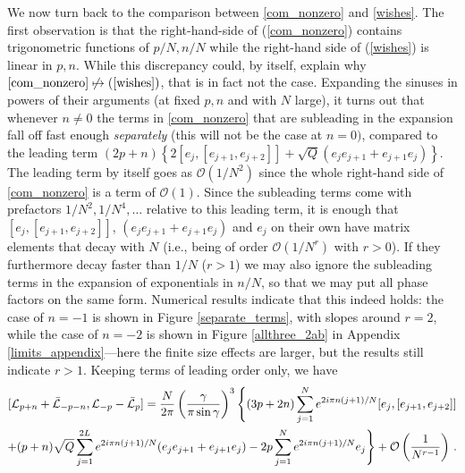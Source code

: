 \documentclass[a4paper,10pt]{article}
\newcommand{\linnea}[1]{$\framebox{\tiny L}$\ \textbf{\texttt{{\color{red}\footnotesize#1}}}}
\newcommand{\KSgen}{\mathcal{L}}
\begin{document}
We now turn back to the comparison between \eqref{com_nonzero} and \eqref{wishes}. The first observation is that the right-hand-side of (\ref{com_nonzero}) contains trigonometric functions of $p/N,n/N$ while the right-hand side of (\ref{wishes}) is linear in $p,n$. While this discrepancy could, by itself, explain why $\eqref{com_nonzero}\not\mapsto (\ref{wishes})$, that is in fact not the case. 
%
%
Expanding the sinuses in powers of their arguments (at fixed $p,n$ and with $N$ large),
it turns out that whenever $n\neq 0$ the terms in \eqref{com_nonzero} that are subleading in the expansion fall off fast enough \emph{separately} (this will not be the case at $n=0)$, compared to the leading term $(2p+n)\left\{ 2[e_j,[e_{j+1},e_{j+2}]] + \sqrt{Q}(e_je_{j+1} + e_{j+1}e_j) \right\}$. The leading term by itself goes as $\mathcal{O}(1/N^2)$ since the whole right-hand side of \eqref{com_nonzero} is a term of $\mathcal{O}(1)$. Since the subleading terms come with prefactors $1/N^2, 1/N^4,\ldots$ relative to this leading term, it is enough that $[e_j,[e_{j+1},e_{j+2}]]$, $(e_je_{j+1} + e_{j+1}e_j)$ and $e_j$ on their own have matrix elements that decay with $N$ (i.e., being of order $\mathcal{O}(1/N^r)$ with $r>0$). If they furthermore decay faster than $1/N$ ($r>1$) we may also ignore the subleading terms in the expansion of exponentials in $n/N$, so that we may put all phase factors on the same form. %
Numerical results indicate that this indeed holds: the case of $n=-1$ is shown in Figure \ref{separate_terms}, with slopes around $r=2$, while the case of $n=-2$ is shown in Figure \ref{allthree_2ab} in Appendix \ref{limits_appendix}---here the finite size effects are larger, but the results still indicate $r>1$.
% 
%
Keeping terms of leading order only, we have %
%
\begin{multline}\label{com_leading}
[\KSgen_{p+n}+\bar{\KSgen}_{-p-n},\KSgen_{-p}-\bar{\KSgen}_{p}] 
=   \frac{N }{2\pi} \left( \frac{\gamma}{\pi \sin \gamma} \right)^3\Bigg\{ (3p+2n) 
\sum_{j=1}^{N}  e^{2i\pi n (j+1) /N}
 [e_j,[e_{j+1},e_{j+2}]] 
 \\
+  (p+n) \sqrt{Q}\sum_{j=1}^{2L} e^{2i\pi n (j+1) /N}
(e_je_{j+1} + e_{j+1}e_j)   
  -2  p \sum_{j=1}^{N} e^{2i\pi n (j+1) /N}
 e_{j} 
\Bigg\}+\mathcal{O}\left({1\over N^{r-1}}\right) \,.
\end{multline}
\end{document}
